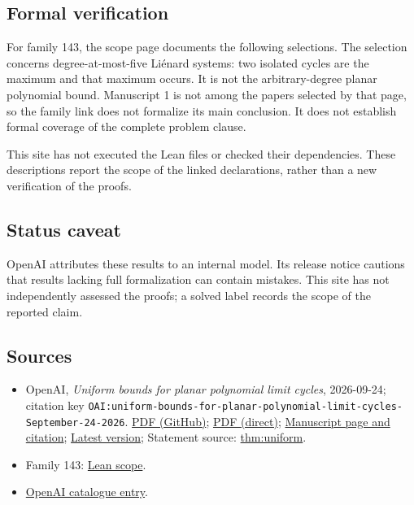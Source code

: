 \documentclass[11pt]{article}
\begin{document}
\subsection{Formal verification}
For family 143, the scope page documents the following selections. The selection concerns degree-at-most-five Liénard systems: two isolated cycles are the maximum and that maximum occurs. It is not the arbitrary-degree planar polynomial bound. Manuscript 1 is not among the papers selected by that page, so the family link does not formalize its main conclusion. It does not establish formal coverage of the complete problem clause.

This site has not executed the Lean files or checked their dependencies. These descriptions report the scope of the linked declarations, rather than a new verification of the proofs.

\subsection{Status caveat}
OpenAI attributes these results to an internal model. Its release notice cautions that results lacking full formalization can contain mistakes. This site has not independently assessed the proofs; a solved label records the scope of the reported claim.

\subsection{Sources}
\begin{itemize}
\item OpenAI, \emph{Uniform bounds for planar polynomial limit cycles}, 2026-09-24; citation key \texttt{OAI:uniform-bounds-for-planar-polynomial-limit-cycles-September-24-2026}. \href{https://github.com/openai/math/blob/adc7f1241b42e322a6451854ab7e4b4c146bf78a/preprints/uniform-bounds-for-planar-polynomial-limit-cycles-September-24-2026/uniform-bounds-for-planar-polynomial-limit-cycles-September-24-2026.pdf}{PDF (GitHub)}; \href{https://github.com/openai/math/raw/adc7f1241b42e322a6451854ab7e4b4c146bf78a/preprints/uniform-bounds-for-planar-polynomial-limit-cycles-September-24-2026/uniform-bounds-for-planar-polynomial-limit-cycles-September-24-2026.pdf}{PDF (direct)}; \href{https://github.com/openai/math/blob/adc7f1241b42e322a6451854ab7e4b4c146bf78a/preprints/uniform-bounds-for-planar-polynomial-limit-cycles-September-24-2026/README.md}{Manuscript page and citation}; \href{https://github.com/openai/math/blob/main/preprints/uniform-bounds-for-planar-polynomial-limit-cycles-September-24-2026/uniform-bounds-for-planar-polynomial-limit-cycles-September-24-2026.pdf}{Latest version}; Statement source: \href{https://github.com/openai/math/blob/adc7f1241b42e322a6451854ab7e4b4c146bf78a/preprints/uniform-bounds-for-planar-polynomial-limit-cycles-September-24-2026/build/sections/01-introduction.tex\#L12}{thm:uniform}.
\item Family 143: \href{https://github.com/openai/math/blob/adc7f1241b42e322a6451854ab7e4b4c146bf78a/lean/docs/143.md}{Lean scope}.
\item \href{https://github.com/openai/math/blob/adc7f1241b42e322a6451854ab7e4b4c146bf78a/CONTENTS.md}{OpenAI catalogue entry}.
\end{itemize}
\end{document}
